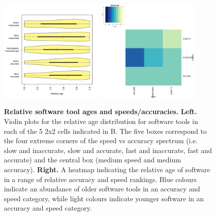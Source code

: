 \documentclass[fleqn,10pt]{SelfArx} %
\begin{document}
\begin{figure}[H]
\centering
\includegraphics[width=0.45\textwidth]{relAge-speedAcc.pdf}
\includegraphics[width=0.45\textwidth]{relAge-SpeedVsAccuracy-heatmap.pdf}
\caption{{\bf Relative software tool ages and speeds/accuracies.} {\bf Left.} Violin plots for the relative age distribution
  for software tools in each of the 5 2x2 cells indicated in B. The
  five boxes correspond to the four extreme corners of the speed vs
  accuracy spectrum (i.e. slow and inaccurate, slow and accurate, fast
  and inaccurate, fast and accurate) and the central box (medium speed
  and medium accuracy). {\bf Right.} A heatmap indicating the relative age
  of software in a range of relative accuracy and speed rankings. Blue
  colours indicate an abundance of older software tools in an accuracy
  and speed category, while light colours indicate younger software in
  an accuracy and speed category. }
\label{fig:ageplot}
\end{figure}


\end{document}
